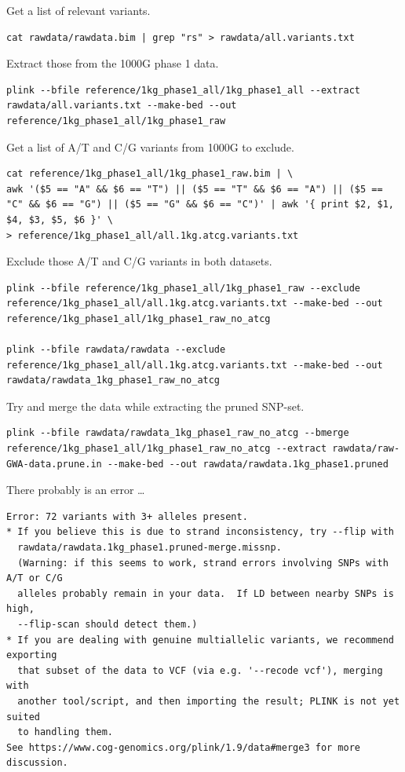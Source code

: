 \documentclass[
]{book}
\begin{document}
Get a list of relevant variants.

\begin{verbatim}
cat rawdata/rawdata.bim | grep "rs" > rawdata/all.variants.txt
\end{verbatim}

Extract those from the 1000G phase 1 data.

\begin{verbatim}
plink --bfile reference/1kg_phase1_all/1kg_phase1_all --extract rawdata/all.variants.txt --make-bed --out reference/1kg_phase1_all/1kg_phase1_raw
\end{verbatim}

Get a list of A/T and C/G variants from 1000G to exclude.

\begin{verbatim}
cat reference/1kg_phase1_all/1kg_phase1_raw.bim | \
awk '($5 == "A" && $6 == "T") || ($5 == "T" && $6 == "A") || ($5 == "C" && $6 == "G") || ($5 == "G" && $6 == "C")' | awk '{ print $2, $1, $4, $3, $5, $6 }' \
> reference/1kg_phase1_all/all.1kg.atcg.variants.txt
\end{verbatim}

Exclude those A/T and C/G variants in both datasets.

\begin{verbatim}
plink --bfile reference/1kg_phase1_all/1kg_phase1_raw --exclude reference/1kg_phase1_all/all.1kg.atcg.variants.txt --make-bed --out reference/1kg_phase1_all/1kg_phase1_raw_no_atcg

plink --bfile rawdata/rawdata --exclude reference/1kg_phase1_all/all.1kg.atcg.variants.txt --make-bed --out rawdata/rawdata_1kg_phase1_raw_no_atcg
\end{verbatim}

Try and merge the data while extracting the pruned SNP-set.

\begin{verbatim}
plink --bfile rawdata/rawdata_1kg_phase1_raw_no_atcg --bmerge reference/1kg_phase1_all/1kg_phase1_raw_no_atcg --extract rawdata/raw-GWA-data.prune.in --make-bed --out rawdata/rawdata.1kg_phase1.pruned
\end{verbatim}

There probably is an error \ldots{}

\begin{verbatim}
Error: 72 variants with 3+ alleles present.
* If you believe this is due to strand inconsistency, try --flip with
  rawdata/rawdata.1kg_phase1.pruned-merge.missnp.
  (Warning: if this seems to work, strand errors involving SNPs with A/T or C/G
  alleles probably remain in your data.  If LD between nearby SNPs is high,
  --flip-scan should detect them.)
* If you are dealing with genuine multiallelic variants, we recommend exporting
  that subset of the data to VCF (via e.g. '--recode vcf'), merging with
  another tool/script, and then importing the result; PLINK is not yet suited
  to handling them.
See https://www.cog-genomics.org/plink/1.9/data#merge3 for more discussion.
\end{verbatim}
\end{document}
